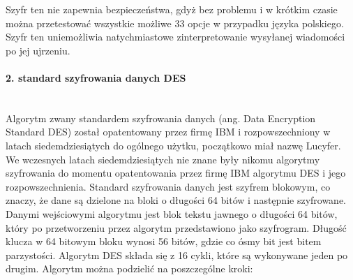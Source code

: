 \documentclass[12p]{article}
\begin{document}
Szyfr ten nie zapewnia bezpieczeństwa, gdyż bez problemu i w krótkim czasie można przetestować wszystkie możliwe 33 opcje w przypadku języka polskiego. Szyfr ten uniemożliwia natychmiastowe zinterpretowanie wysyłanej wiadomości po jej ujrzeniu. 

\paragraph{2. standard szyfrowania danych DES}\mbox{} \\

Algorytm zwany standardem szyfrowania danych (ang. Data Encryption Standard DES) został opatentowany przez firmę IBM i rozpowszechniony w latach siedemdziesiątych do ogólnego użytku, początkowo miał nazwę Lucyfer. We wczesnych latach siedemdziesiątych nie znane były nikomu algorytmy szyfrowania do momentu opatentowania przez firmę IBM algorytmu DES i jego rozpowszechnienia. Standard szyfrowania danych jest szyfrem blokowym, co znaczy, że dane są dzielone na bloki o długości 64 bitów i następnie szyfrowane. Danymi wejściowymi algorytmu jest blok tekstu jawnego o długości 64 bitów, który po przetworzeniu przez algorytm przedstawiono jako szyfrogram. Długość klucza w 64 bitowym bloku wynosi 56 bitów, gdzie co ósmy bit jest bitem parzystości. Algorytm DES składa się z 16 cykli, które są wykonywane jeden po drugim. Algorytm można podzielić na poszczególne kroki:
\end{document}
